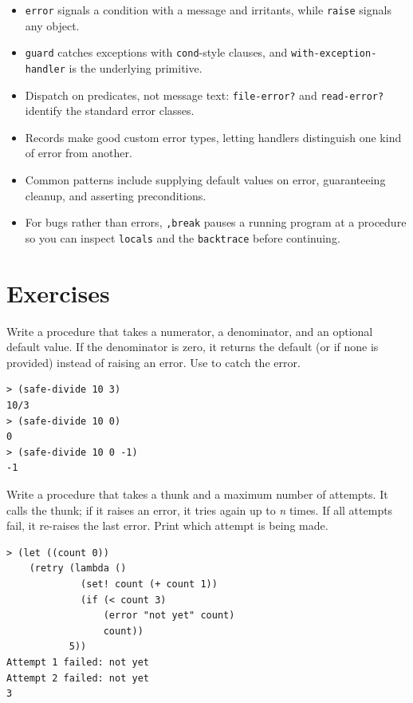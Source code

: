 \begin{itemize}
    \item \texttt{error} signals a condition with a message and irritants, while \texttt{raise} signals any object.
    \item \texttt{guard} catches exceptions with
    \texttt{cond}-style clauses, and
    \texttt{with-exception-\allowbreak handler} is the underlying primitive.
    \item Dispatch on predicates, not message text:
    \texttt{file-error?} and \texttt{read-error?} identify
    the standard error classes.
    \item Records make good custom error types, letting handlers distinguish one kind of error from another.
    \item Common patterns include supplying default values on error, guaranteeing cleanup, and asserting preconditions.
    \item For bugs rather than errors, \texttt{,break} pauses a running program at a procedure so you can inspect \texttt{locals} and the \texttt{backtrace} before continuing.
\end{itemize}

\section*{Exercises}

\begin{exercise}
Write a  procedure that takes a numerator, a denominator, and an optional default value. If the denominator is zero, it returns the default (or  if none is provided) instead of raising an error. Use  to catch the error.

\begin{lstlisting}[style=repl]
> (safe-divide 10 3)
10/3
> (safe-divide 10 0)
0
> (safe-divide 10 0 -1)
-1
\end{lstlisting}
\end{exercise}

\begin{exercise}
Write a  procedure that takes a thunk and a maximum number of attempts. It calls the thunk; if it raises an error, it tries again up to \emph{n} times. If all attempts fail, it re-raises the last error. Print which attempt is being made.

\begin{lstlisting}[style=repl]
> (let ((count 0))
    (retry (lambda ()
             (set! count (+ count 1))
             (if (< count 3)
                 (error "not yet" count)
                 count))
           5))
Attempt 1 failed: not yet
Attempt 2 failed: not yet
3
\end{lstlisting}
\end{exercise}

